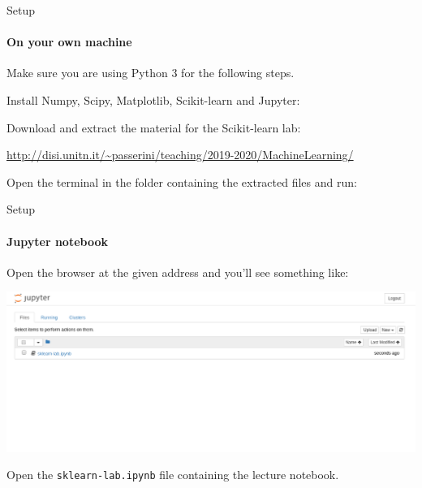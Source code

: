 \documentclass{beamer}
\begin{document}
\begin{frame}{Setup}
\framesubtitle{On your own machine}
\centering

Make sure you are using Python 3 for the following steps.

\vspace{0.1in}

Install Numpy, Scipy, Matplotlib, Scikit-learn and Jupyter:
\pipinstall

\vspace{0.2in}

Download and extract the material for the Scikit-learn lab:


{\footnotesize \scriptsize \url{http://disi.unitn.it/~passerini/teaching/2019-2020/MachineLearning/}}

Open the terminal in the folder containing the extracted files and run:
\launchjupyter

\end{frame}


\begin{frame}{Setup}
\framesubtitle{Jupyter notebook}
\centering

Open the browser at the given address and you'll see something like:

\vspace{0.2in}
\includegraphics[width=\textwidth]{figures/home}

\vspace{-0.8in}

Open the \texttt{sklearn-lab.ipynb} file containing the lecture notebook.

\end{frame}

\end{document}
